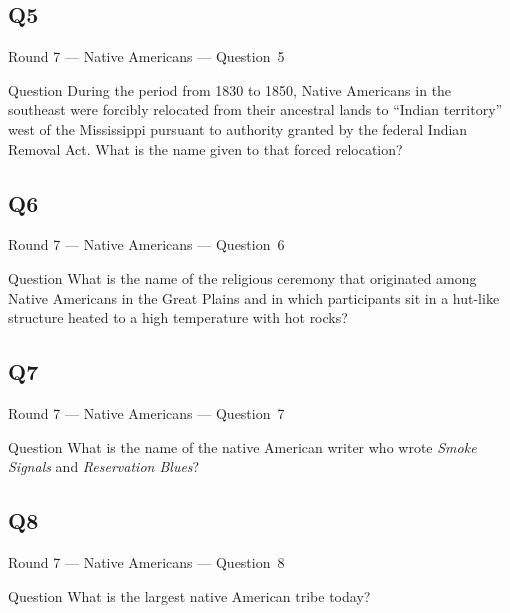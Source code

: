 \documentclass[11pt]{beamer}
\begin{document}
\subsection*{Q5}
\begin{frame}[t]{Round 7 --- Native Americans --- \mbox{Question 5}}
\vspace{-0.5em}
\begin{block}{Question}
During the period from 1830 to 1850, Native Americans in the southeast were forcibly relocated from their ancestral lands to ``Indian territory'' west of the Mississippi pursuant to authority granted by the federal Indian Removal Act.  What is the name given to that forced relocation?
\end{block}
\end{frame}
\subsection*{Q6}
\begin{frame}[t]{Round 7 --- Native Americans --- \mbox{Question 6}}
\vspace{-0.5em}
\begin{block}{Question}
What is the name of the religious ceremony that originated among Native Americans in the Great Plains and in which participants sit in a hut-like structure heated to a high temperature with hot rocks?
\end{block}
\end{frame}
\subsection*{Q7}
\begin{frame}[t]{Round 7 --- Native Americans --- \mbox{Question 7}}
\vspace{-0.5em}
\begin{block}{Question}
What is the name of the native American writer who wrote \emph{Smoke Signals} and \emph{Reservation Blues}?
\end{block}
\end{frame}
\subsection*{Q8}
\begin{frame}[t]{Round 7 --- Native Americans --- \mbox{Question 8}}
\vspace{-0.5em}
\begin{block}{Question}
What is the largest native American tribe today?
\end{block}
\end{frame}
\end{document}
